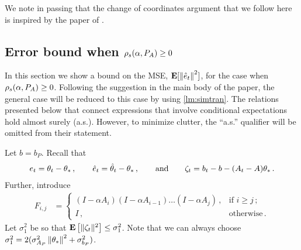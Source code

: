 We note in passing that the change of coordinates argument that we follow here is inspired 
by the paper of \citet{lihong}. 

\subsection{Error bound when $\rho_s(\alpha,P_A)\ge 0$}
In this section we show a bound on the MSE, $\mathbf{E}[\left\| \hat{e}_t\right\|^2]$, for the case when $\rho_s(\alpha,P_A)\ge 0$.
Following the suggestion in the main body of the paper, the general case will be reduced to this case by using 
\cref{lm:simtran}.
The relations presented below that connect expressions that involve conditional expectations hold almost surely (a.s.).
However, to minimize clutter, the ``a.s.'' qualifier will be omitted from their statement.

Let $b = b_P$.
Recall that 
\begin{align*}
e_t =  \theta_t-\theta_*\,, \qquad 
\hat{e}_t = \hat{\theta}_t-\theta_*\,, \qquad  \text{and} \qquad 
\zeta_t = b_t-b-(A_t-A)\theta_*\,.
\end{align*}
Further, introduce
\begin{align*}
F_{i,j} & =
\begin{cases}
 (I-\alpha A_i)(I-\alpha A_{i-1}) \dots (I-\alpha A_j)\,, & \text{if } i\ge j\,;\\
 I\,, & \text{otherwise}\,.
\end{cases}
\end{align*}
Let $\sigma_1^2$ be so that 
$\mathbf{E}\left[\| \zeta_t\|^2\right]\leq \sigma_1^2$.
Note that we can always choose $\sigma_1^2 = 2( \sigma_{A_P}^2\left\| \theta_*\right\|^2+\sigma_{b_P}^2)$.

